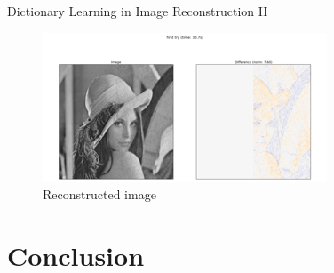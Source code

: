 \documentclass[10pt]{beamer}
\begin{document}
\begin{frame}{Dictionary Learning in Image Reconstruction II}
	\begin{figure}[h!]
		\centering
		\includegraphics[width = 0.8\linewidth]{lena_reconstructed.png}
		\caption{Reconstructed image}
	\end{figure}
\end{frame}




\section{Conclusion}
\end{document}
